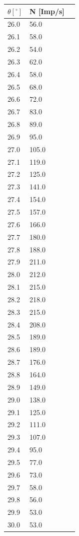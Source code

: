 \begin{minipage}{\linewidth}
    \begin{table}[H]
        \centering
    \begin{tabular}{lll}
        \toprule
        $\theta [^\circ]$ & N [Imp/s] \\
        \midrule
        26.0  &	56.0  \\
        26.1  &	58.0  \\
        26.2  &	54.0  \\
        26.3  &	62.0  \\
        26.4  &	58.0  \\
        26.5  &	68.0  \\
        26.6  &	72.0  \\
        26.7  &	83.0  \\
        26.8  &	89.0  \\
        26.9  &	95.0  \\
        27.0  &	105.0 \\
        27.1  &	119.0 \\
        27.2  &	125.0 \\
        27.3  &	141.0 \\
        27.4  &	154.0 \\
        27.5  &	157.0 \\
        27.6  &	166.0 \\
        27.7  &	180.0 \\
        27.8  &	188.0 \\
        27.9  &	211.0 \\
        28.0  &	212.0 \\
        28.1  &	215.0 \\
        28.2  &	218.0 \\
        28.3  &	215.0 \\
        28.4  &	208.0 \\
        28.5  &	189.0 \\
        28.6  &	189.0 \\
        28.7  &	176.0 \\
        28.8  &	164.0 \\
        28.9  &	149.0 \\
        29.0  &	138.0 \\
        29.1  &	125.0 \\
        29.2  &	111.0 \\
        29.3  &	107.0 \\
        29.4  &	95.0  \\
        29.5  &	77.0  \\
        29.6  &	73.0  \\
        29.7  &	58.0  \\
        29.8  &	56.0  \\
        29.9  &	53.0  \\
        30.0  &	53.0  \\
        \bottomrule   
    \end{tabular}
    
    \label{tab:1}
\end{table}
\end{minipage}


